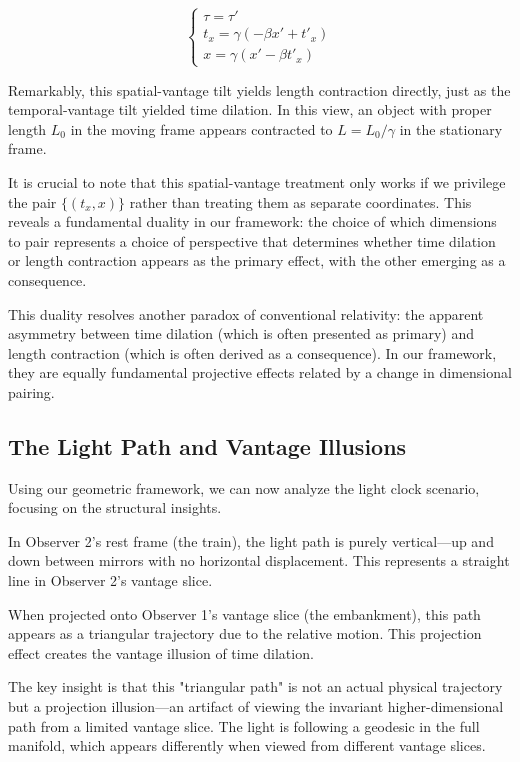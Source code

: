 \documentclass{article}
\begin{document}
\begin{equation}
\begin{cases}
\tau = \tau' \\
t_x = \gamma(-\beta x' + t'_x) \\
x = \gamma(x' - \beta t'_x)
\end{cases}
\end{equation}

Remarkably, this spatial-vantage tilt yields length contraction directly, just as the temporal-vantage tilt yielded time dilation. In this view, an object with proper length $L_0$ in the moving frame appears contracted to $L = L_0/\gamma$ in the stationary frame.

It is crucial to note that this spatial-vantage treatment only works if we privilege the pair $\{(t_x, x)\}$ rather than treating them as separate coordinates. This reveals a fundamental duality in our framework: the choice of which dimensions to pair represents a choice of perspective that determines whether time dilation or length contraction appears as the primary effect, with the other emerging as a consequence.

This duality resolves another paradox of conventional relativity: the apparent asymmetry between time dilation (which is often presented as primary) and length contraction (which is often derived as a consequence). In our framework, they are equally fundamental projective effects related by a change in dimensional pairing.

\subsection{The Light Path and Vantage Illusions}

Using our geometric framework, we can now analyze the light clock scenario, focusing on the structural insights.

In Observer 2's rest frame (the train), the light path is purely vertical—up and down between mirrors with no horizontal displacement. This represents a straight line in Observer 2's vantage slice.

When projected onto Observer 1's vantage slice (the embankment), this path appears as a triangular trajectory due to the relative motion. This projection effect creates the vantage illusion of time dilation.

The key insight is that this "triangular path" is not an actual physical trajectory but a projection illusion—an artifact of viewing the invariant higher-dimensional path from a limited vantage slice. The light is following a geodesic in the full manifold, which appears differently when viewed from different vantage slices.
\end{document}
